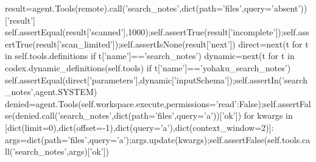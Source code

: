         result=agent.Tools(remote).call('search_notes',dict(path='files',query='absent'))['result']
        self.assertEqual(result['scanned'],1000);self.assertTrue(result['incomplete']);self.assertTrue(result['scan_limited']);self.assertIsNone(result['next'])
        direct=next(t for t in self.tools.definitions if t['name']=='search_notes')
        dynamic=next(t for t in codex.dynamic_definitions(self.tools) if t['name']=='yohaku_search_notes')
        self.assertEqual(direct['parameters'],dynamic['inputSchema']);self.assertIn('search_notes',agent.SYSTEM)
        denied=agent.Tools(self.workspace.execute,permissions={'read':False});self.assertFalse(denied.call('search_notes',dict(path='files',query='a'))['ok'])
        for kwargs in [dict(limit=0),dict(offset=-1),dict(query='a\nb'),dict(context_window=2)]:
            args=dict(path='files',query='a');args.update(kwargs);self.assertFalse(self.tools.call('search_notes',args)['ok'])

